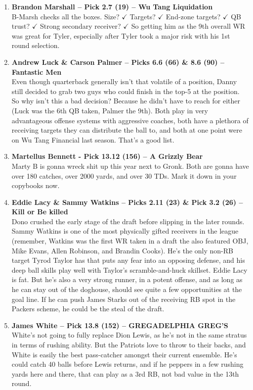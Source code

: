 \documentclass[11pt,letterpaper]{article}
\begin{document}
\begin{enumerate}
\item \textbf{Brandon Marshall -- Pick 2.7 (19) -- Wu Tang Liquidation}
\\B-Marsh checks all the boxes. Size? $\checkmark$ Targets? $\checkmark$ End-zone targets? $\checkmark$ QB trust? $\checkmark$ Strong secondary receiver? $\checkmark$ So getting him as the 9th overall WR was great for Tyler, especially after Tyler took a major risk with his 1st round selection.

\item \textbf{Andrew Luck \& Carson Palmer -- Picks 6.6 (66) \& 8.6 (90) -- Fantastic Men}
\\Even though quarterback generally isn't that volatile of a position, Danny still decided to grab two guys who could finish in the top-5 at the position. So why isn't this a bad decision? Because he didn't have to reach for either (Luck was the 6th QB taken, Palmer the 9th). Both play in very advantageous offense systems with aggressive coaches, both have a plethora of receiving targets they can distribute the ball to, and both at one point were on Wu Tang Financial last season. That's a good list.

\item \textbf{Martellus Bennett - Pick 13.12 (156) -- A Grizzly Bear}
\\Marty B is gonna wreck shit up this year next to Gronk. Both are gonna have over 180 catches, over 2000 yards, and over 30 TDs. Mark it down in your copybooks now.

\item \textbf{Eddie Lacy \& Sammy Watkins -- Picks 2.11 (23) \& Pick 3.2 (26) -- Kill or Be killed}
\\Dono crushed the early stage of the draft before slipping in the later rounds. Sammy Watkins is one of the most physically gifted receivers in the league (remember, Watkins was the first WR taken in a draft the also featured OBJ, Mike Evans, Allen Robinson, and Brandin Cooks). He's the only non-RB target Tyrod Taylor has that puts any fear into an opposing defense, and his deep ball skills play well with Taylor's scramble-and-huck skillset. Eddie Lacy is fat. But he's also a very strong runner, in a potent offense, and as long as he can stay out of the doghouse, should see quite a few opportunities at the goal line. If he can push James Starks out of the receiving RB spot in the Packers scheme, he could be the steal of the draft.
 
\item \textbf{James White -- Pick 13.8 (152) -- GREGADELPHIA GREG'S}
\\White's not going to fully replace Dion Lewis, as he's not in the same stratus in terms of rushing ability. But the Patriots love to throw to their backs, and White is easily the best pass-catcher amongst their current ensemble. He's could catch 40 balls before Lewis returns, and if he peppers in a few rushing yards here and there, that can play as a 3rd RB, not bad value in the 13th round.

\end{enumerate}
\end{document}
